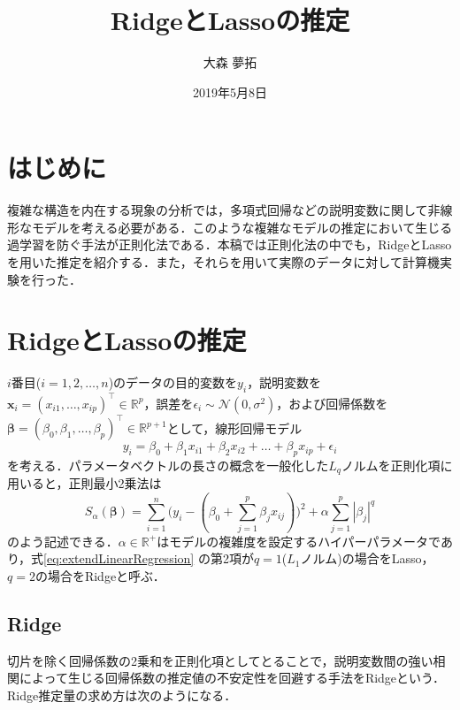 \documentclass[a4paper,twocolumn]{ujarticle} %
\title{RidgeとLassoの推定} %
\date{2019年5月8日}
\author{大森 夢拓}
\begin{document}
\maketitle
\section{はじめに}
複雑な構造を内在する現象の分析では，多項式回帰などの説明変数に関して非線形なモデルを考える必要がある．このような複雑なモデルの推定において生じる過学習を防ぐ手法が正則化法である．本稿では正則化法の中でも，RidgeとLassoを用いた推定を紹介する．また，それらを用いて実際のデータに対して計算機実験を行った．

\section{RidgeとLassoの推定}
$i$番目($i = 1, 2, \dots, n$)のデータの目的変数を$y_i$，説明変数を$\bm{x}_i=(x_{i1}, \dots, x_{ip})^{\top} \in \mathbb{R}^p$，誤差を$\epsilon_i \sim \mathcal{N}(0, \sigma^2)$，および回帰係数を$\bm{\beta}=(\beta_0, \beta_1, \dots , \beta_p)^{\top} \in \mathbb{R}^{p+1}$として，線形回帰モデル
\begin{equation}
	y_i=\beta_0 + \beta_1 x_{i1} + \beta_2  x_{i2} + \dots + \beta_p x_{ip} + \epsilon_i
	\label{eq:linear_model_origin}
\end{equation}
を考える．パラメータベクトルの長さの概念を一般化した$L_q$ノルムを正則化項に用いると，正則最小2乗法は
\begin{equation}
	S_{\alpha}(\bm{\beta}) = \sum_{i=1}^{n}\bigl(
		y_i - (
			\beta_0 + \sum_{j=1}^{p} \beta_j {x}_{ij}
		)
	\bigr)^2 + \alpha \sum_{j=1}^{p} |\beta_j|^q
	\label{eq:extendLinearRegression}
\end{equation}
のよう記述できる．$\alpha \in \mathbb{R}^+$はモデルの複雑度を設定するハイパーパラメータであり，式\eqref{eq:extendLinearRegression} の第2項が$q=1$($L_1$ノルム)の場合をLasso，$q=2$の場合をRidgeと呼ぶ．

\subsection{Ridge}
切片を除く回帰係数の2乗和を正則化項としてとることで，説明変数間の強い相関によって生じる回帰係数の推定値の不安定性を回避する手法をRidgeという．Ridge推定量の求め方は次のようになる．
\end{document}
